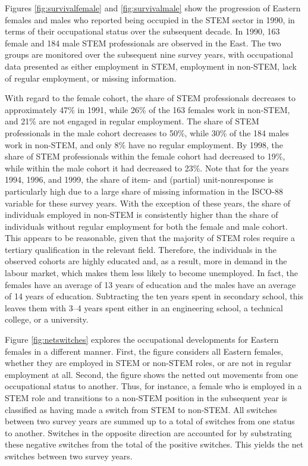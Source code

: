 \documentclass[a4paper, oneside, hyperfootnotes = false]{article}
\begin{document}
{Figures \ref{fig:survivalfemale} and \ref{fig:survivalmale} show the progression of Eastern females and males who reported being occupied in the STEM sector in 1990, in terms of their occupational status over the subsequent decade.
In 1990, 163 female and 184 male STEM professionals are observed in the East.
The two groups are monitored over the subsequent nine survey years, with occupational data presented as either employment in STEM, employment in non-STEM, lack of regular employment, or missing information.

With regard to the female cohort, the share of STEM professionals decreases to approximately 47\% in 1991, while 26\% of the 163 females work in non-STEM, and 21\% are not engaged in regular employment.
The share of STEM professionals in the male cohort decreases to 50\%, while 30\% of the 184 males work in non-STEM, and only 8\% have no regular employment.
By 1998, the share of STEM professionals within the female cohort had decreased to 19\%, while within the male cohort it had decreased to 23\%.
Note that for the years 1994, 1996, and 1999, the share of item- and (partial) unit-nonresponse is particularly high due to a large share of missing information in the ISCO-88 variable for these survey years.
With the exception of these years, the share of individuals employed in non-STEM is consistently higher than the share of individuals without regular employment for both the female and male cohort.
This appears to be reasonable, given that the majority of STEM roles require a tertiary qualification in the relevant field.
Therefore, the individuals in the observed cohorts are highly educated and, as a result, more in demand in the labour market, which makes them less likely to become unemployed.
In fact, the females have an average of 13 years of education and the males have an average of 14 years of education.
Subtracting the ten years spent in secondary school, this leaves them with 3--4 years spent either in an engineering school, a technical college, or a university.

Figure \ref{fig:netswitches} explores the occupational developments for Eastern females in a different manner.
First, the figure considers all Eastern females, whether they are employed in STEM or non-STEM roles, or are not in regular employment at all.
Second, the figure shows the netted out movements from one occupational status to another.
Thus, for instance, a female who is employed in a STEM role and transitions to a non-STEM position in the subsequent year is classified as having made a switch from STEM to non-STEM.
All switches between two survey years are summed up to a total of switches from one status to another.
Switches in the opposite direction are accounted for by substrating these negative switches from the total of the positive switches.
This yields the net switches between two survey years.

}
\end{document}
